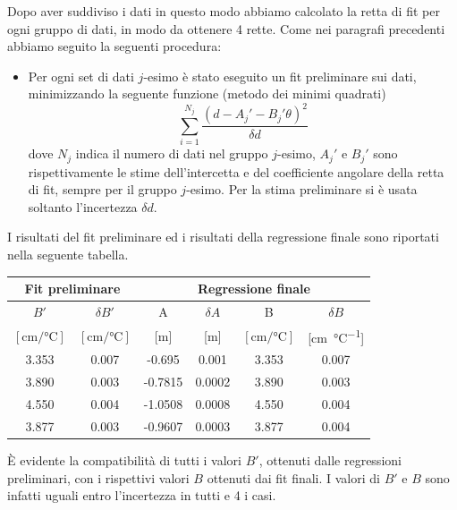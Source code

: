 Dopo aver suddiviso i dati in questo modo abbiamo calcolato la retta di fit per ogni gruppo di dati, in modo da ottenere
4 rette. Come nei paragrafi precedenti abbiamo seguito la seguenti procedura:

\begin{itemize}
    \item{Per ogni set di dati $j$-esimo è stato eseguito un fit preliminare sui dati,
            minimizzando la seguente funzione (metodo dei minimi quadrati)
            \begin{equation}
                \sum_{i=1}^{N_j} \frac{(d - A_j' - B_j'\theta)^2}{\delta d}
            \end{equation}
            dove $N_j$ indica il numero di dati nel gruppo $j$-esimo, $A_j'$ e $B_j'$ sono rispettivamente
            le stime dell'intercetta e del coefficiente angolare della retta di fit, sempre per il gruppo $j$-esimo.
            Per la stima preliminare si è usata soltanto l'incertezza $\delta d$.
        }
\end{itemize}

I risultati del fit preliminare ed i risultati della regressione finale sono riportati nella seguente tabella.

\begin{center}
    \begin{tabular}{c c | c c c c}
        \toprule
        \multicolumn{2}{c|}{Fit preliminare} & \multicolumn{4}{c}{Regressione finale} \\
        \midrule
        $B'$ & $\delta B'$ & A & $\delta A$ & B & $\delta B$ \\
        $[\si{\centi\meter\per\celsius}]$ & $[\si{\centi\meter\per\celsius}]$ &
        [m] & [m] & $[\si{\centi\meter\per\celsius}]$ & [\si{\centi\metre\per\celsius}] \\
        \midrule
        3.353 & 0.007 & -0.695  & 0.001 & 3.353 & 0.007 \\
        3.890 & 0.003 & -0.7815 & 0.0002 & 3.890 & 0.003 \\
        4.550 & 0.004 & -1.0508 & 0.0008 & 4.550 & 0.004 \\
        3.877 & 0.003 & -0.9607 & 0.0003 & 3.877 & 0.004 \\
        \bottomrule
    \end{tabular}
\end{center}

È evidente la compatibilità di tutti i valori $B'$, ottenuti dalle regressioni preliminari, con i rispettivi valori $B$ ottenuti dai
fit finali. I valori di $B'$ e $B$ sono infatti uguali entro l'incertezza in tutti e 4 i casi.
